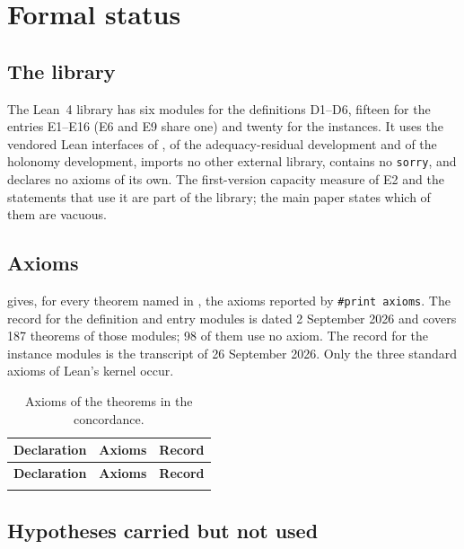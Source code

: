 \section{Formal status}
\label{supp:status}

\subsection{The library}

The Lean~4 library has six modules for the definitions D1--D6, fifteen for the entries E1--E16 (E6
and E9 share one) and twenty for the instances. It uses the vendored Lean interfaces of \FoundIII{},
of the adequacy-residual development and of the holonomy development, imports no other external
library, contains no \texttt{sorry}, and declares no axioms of its own. The first-version capacity
measure of E2 and the statements that use it are part of the library; the main paper states which
of them are vacuous.

\subsection{Axioms}

 gives, for every theorem named in , the axioms reported by
\texttt{\#print axioms}. The record for the definition and entry modules is dated 2 September 2026
and covers 187 theorems of those modules; 98 of them use no axiom. The record for the instance
modules is the transcript of 26 September 2026. Only the three standard axioms of Lean's kernel
occur.

{\scriptsize
\begin{longtable}{@{}>{\raggedright\arraybackslash}p{8.8cm}>{\raggedright\arraybackslash}p{3.6cm}l@{}}
\caption{Axioms of the theorems in the concordance.}\label{tab:axioms}\\
\toprule
\textbf{Declaration} & \textbf{Axioms} & \textbf{Record} \\
\midrule
\endfirsthead
\toprule
\textbf{Declaration} & \textbf{Axioms} & \textbf{Record} \\
\midrule
\endhead
\bottomrule
\endfoot

\end{longtable}
}

\subsection{Hypotheses carried but not used}

